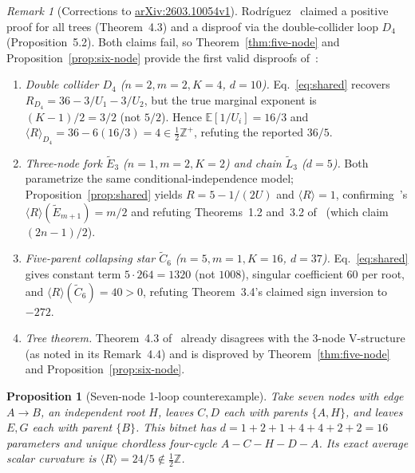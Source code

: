 \documentclass[11pt]{article}
\theoremstyle{plain}
\newtheorem{proposition}[theorem]{Proposition}
\theoremstyle{definition}
\theoremstyle{remark}
\newtheorem{remark}{Remark}
\begin{document}
\begin{remark}[Corrections to \href{https://arxiv.org/abs/2603.10054v1}{arXiv:2603.10054v1}]
Rodr\'iguez~\cite{Rodriguez2026} claimed a positive proof for all trees (Theorem~4.3) and a disproof via the double-collider loop $D_4$ (Proposition~5.2). Both claims fail, so Theorem~\ref{thm:five-node} and Proposition~\ref{prop:six-node} provide the first valid disproofs of~\cite{Rodriguez2004}:
\begin{enumerate}[label=\textup{(\alph*)}]
\item \emph{Double collider $D_4$ ($n=2, m=2, K=4$, $d=10$).} Eq.~\eqref{eq:shared} recovers $R_{D_4} = 36 - 3/U_1 - 3/U_2$, but the true marginal exponent is $(K-1)/2 = 3/2$ (not $5/2$). Hence $\mathbb{E}[1/U_i] = 16/3$ and $\langle R \rangle_{D_4} = 36 - 6(16/3) = 4 \in \tfrac{1}{2}\mathbb{Z}^+$, refuting the reported $36/5$.
\item \emph{Three-node fork $\tilde{E}_3$ ($n=1, m=2, K=2$) and chain $\tilde{L}_3$ ($d=5$).} Both parametrize the same conditional-independence model; Proposition~\ref{prop:shared} yields $R = 5 - 1/(2U)$ and $\langle R \rangle = 1$, confirming~\cite{Rodriguez2004}'s $\langle R \rangle(\tilde{E}_{m+1}) = m/2$ and refuting Theorems~1.2 and~3.2 of~\cite{Rodriguez2026} (which claim $(2n-1)/2$).
\item \emph{Five-parent collapsing star $\tilde{C}_6$ ($n=5, m=1, K=16$, $d=37$).} Eq.~\eqref{eq:shared} gives constant term $5\cdot 264 = 1320$ (not $1008$), singular coefficient $60$ per root, and $\langle R \rangle(\tilde{C}_6) = 40 > 0$, refuting Theorem~3.4's claimed sign inversion to $-272$.
\item \emph{Tree theorem.} Theorem~4.3 of~\cite{Rodriguez2026} already disagrees with the 3-node V-structure (as noted in its Remark~4.4) and is disproved by Theorem~\ref{thm:five-node} and Proposition~\ref{prop:six-node}.
\end{enumerate}
\end{remark}

\begin{proposition}[Seven-node 1-loop counterexample]\label{prop:loop}
Take seven nodes with edge $A \to B$, an independent root $H$, leaves $C, D$ each with parents $\{A, H\}$, and leaves $E, G$ each with parent $\{B\}$. This bitnet has $d = 1 + 2 + 1 + 4 + 4 + 2 + 2 = 16$ parameters and unique chordless four-cycle $A - C - H - D - A$. Its exact average scalar curvature is $\langle R \rangle = 24/5 \notin \frac{1}{2}\mathbb{Z}$.
\end{proposition}
\end{document}
